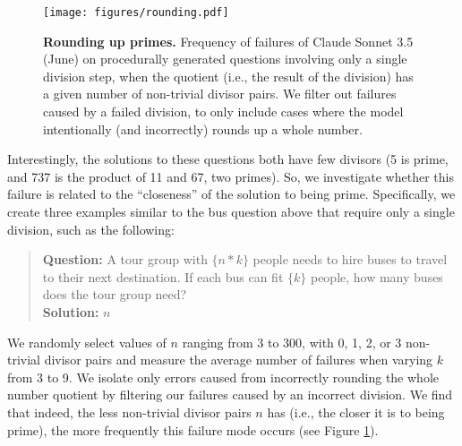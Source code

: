 \begin{figure}
    \centering
    \texttt{[image: figures/rounding.pdf]}
    \caption{\textbf{Rounding up primes.} Frequency of failures of Claude Sonnet 3.5 (June) on procedurally generated questions involving only a single division step, when the quotient (i.e., the result of the division) has a given number of non-trivial divisor pairs. We filter out failures caused by a failed division, to only include cases where the model intentionally (and incorrectly) rounds up a whole number.}
    \label{appfig:rounding}
\end{figure}

Interestingly, the solutions to these questions both have few divisors (5 is prime, and 737 is the product of 11 and 67, two primes). So, we investigate whether this failure is related to the ``closeness'' of the solution to being prime. Specifically, we create three examples similar to the bus question above that require only a single division, such as the following:
\begin{quote}
\small
\textbf{Question:} A tour group with $\{n*k\}$ people needs to hire buses to travel to their next destination. If each bus can fit $\{k\}$ people, how many buses does the tour group need?\\
\textbf{Solution:} $n$
\end{quote}

We randomly select values of $n$ ranging from 3 to 300, with 0, 1, 2, or 3 non-trivial divisor pairs and measure the average number of failures when varying $k$ from 3 to 9. We isolate only errors caused from incorrectly rounding the whole number quotient by filtering our failures caused by an incorrect division. We find that indeed, the less non-trivial divisor pairs $n$ has (i.e., the closer it is to being prime), the more frequently this failure mode occurs (see Figure \ref{appfig:rounding}).


















